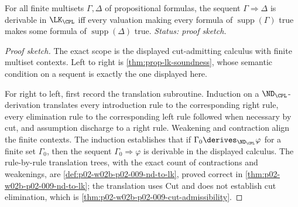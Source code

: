 \begin{theorem}
\label{thm:prop-lk-completeness}
For all finite multisets \(\Gamma,\Delta\) of propositional formulas, the
sequent \(\Gamma\Rightarrow\Delta\) is derivable in \(\LK_{\CPL}\) iff
every valuation making every formula of \(\operatorname{supp}(\Gamma)\)
true makes some formula of \(\operatorname{supp}(\Delta)\) true.
\textit{Status: proof sketch.}
\end{theorem}
\begin{proof}[Proof sketch]
The exact scope is the displayed cut-admitting calculus with finite multiset
contexts.  Left to right is \cref{thm:prop-lk-soundness}, whose semantic
condition on a sequent is exactly the one displayed here.

For right to left, first record the translation subroutine.  Induction on
a \(\ND_{\CPL}\)-derivation translates every introduction rule to the
corresponding right rule, every elimination rule to the corresponding
left rule followed when necessary by cut, and assumption discharge to a
right rule.  Weakening and contraction align the finite contexts.  The
induction establishes that if
\(\Gamma_0\derives_{\ND_{\CPL}}\varphi\) for a finite set \(\Gamma_0\),
then the sequent \(\Gamma_0\Rightarrow\varphi\) is derivable in the
displayed calculus.  The rule-by-rule translation trees, with the exact
count of contractions and weakenings, are
\cref{def:p02-w02b-p02-009-nd-to-lk}, proved correct in
\cref{thm:p02-w02b-p02-009-nd-to-lk}; the translation uses Cut and does not
establish cut elimination, which is
\cref{thm:p02-w02b-p02-009-cut-admissibility}.


\end{proof}
